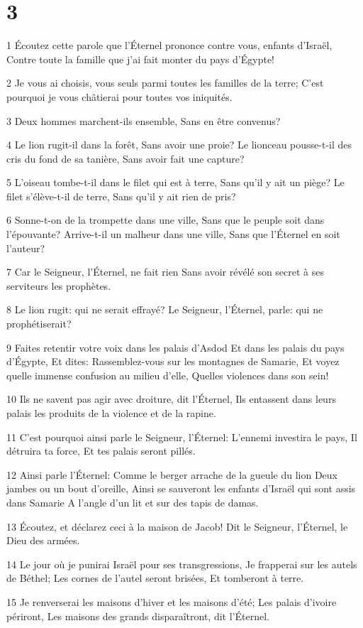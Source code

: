 \chapter{3}

\par 1 Écoutez cette parole que l'Éternel prononce contre vous, enfants d'Israël, Contre toute la famille que j'ai fait monter du pays d'Égypte!
\par 2 Je vous ai choisis, vous seuls parmi toutes les familles de la terre; C'est pourquoi je vous châtierai pour toutes vos iniquités.
\par 3 Deux hommes marchent-ils ensemble, Sans en être convenus?
\par 4 Le lion rugit-il dans la forêt, Sans avoir une proie? Le lionceau pousse-t-il des cris du fond de sa tanière, Sans avoir fait une capture?
\par 5 L'oiseau tombe-t-il dans le filet qui est à terre, Sans qu'il y ait un piège? Le filet s'élève-t-il de terre, Sans qu'il y ait rien de pris?
\par 6 Sonne-t-on de la trompette dans une ville, Sans que le peuple soit dans l'épouvante? Arrive-t-il un malheur dans une ville, Sans que l'Éternel en soit l'auteur?
\par 7 Car le Seigneur, l'Éternel, ne fait rien Sans avoir révélé son secret à ses serviteurs les prophètes.
\par 8 Le lion rugit: qui ne serait effrayé? Le Seigneur, l'Éternel, parle: qui ne prophétiserait?
\par 9 Faites retentir votre voix dans les palais d'Asdod Et dans les palais du pays d'Égypte, Et dites: Rassemblez-vous sur les montagnes de Samarie, Et voyez quelle immense confusion au milieu d'elle, Quelles violences dans son sein!
\par 10 Ils ne savent pas agir avec droiture, dit l'Éternel, Ils entassent dans leurs palais les produits de la violence et de la rapine.
\par 11 C'est pourquoi ainsi parle le Seigneur, l'Éternel: L'ennemi investira le pays, Il détruira ta force, Et tes palais seront pillés.
\par 12 Ainsi parle l'Éternel: Comme le berger arrache de la gueule du lion Deux jambes ou un bout d'oreille, Ainsi se sauveront les enfants d'Israël qui sont assis dans Samarie A l'angle d'un lit et sur des tapis de damas.
\par 13 Écoutez, et déclarez ceci à la maison de Jacob! Dit le Seigneur, l'Éternel, le Dieu des armées.
\par 14 Le jour où je punirai Israël pour ses transgressions, Je frapperai sur les autels de Béthel; Les cornes de l'autel seront brisées, Et tomberont à terre.
\par 15 Je renverserai les maisons d'hiver et les maisons d'été; Les palais d'ivoire périront, Les maisons des grands disparaîtront, dit l'Éternel.

